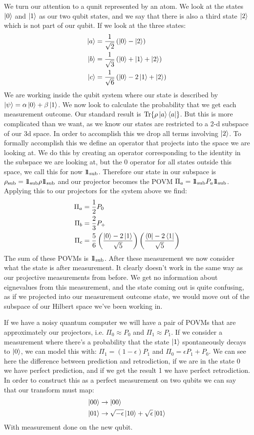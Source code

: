 We turn our attention to a qunit represented by an atom. We look at the states $\ket{0}$ and $\ket{1}$ as our two qubit states, and we say that there is also a third state $\ket{2}$ which is not part of our qubit. If we look at the three states:
\begin{align*}
	\ket{a} &= \frac{1}{\sqrt{2}} \left(\ket{0} - \ket{2}\right) \\
	\ket{b} &= \frac{1}{\sqrt{3}} \left(\ket{0} + \ket{1} + \ket{2}\right) \\
	\ket{c} &= \frac{1}{\sqrt{6}} \left( \ket{0} - 2\ket{1} + \ket{2}\right)
\end{align*}
We are working inside the qubit system where our state is described by $\ket{\psi} = \alpha\ket{0} + \beta \ket{1}$. We now look to calculate the probability that we get each measurement outcome.
Our standard result is $\Tr{\rho \ket{a}\bra{a}}$. But this is more complicated than we want, as we know our states are restricted to a 2-d subspace of our 3d space. 
In order to accomplish this we drop all terms involving $\ket{2}$. To formally accomplish this we define an operator that projects into the space we are looking at.
We do this by creating an operator corresponding to the identity in the subspace we are looking at, but the 0 operator for all states outside this space, we call this for now $1\!\!1_\text{sub}$.
Therefore our state in our subspace is $\rho_\text{sub} = 1\!\!1_\text{sub} \rho1\!\!1_\text{sub}$ and our projector becomes the POVM $\Pi_a = 1\!\!1_\text{sub}P_a1\!\!1_\text{sub}$.
Applying this to our projectors for the system above we find:
\begin{align*}
	\Pi_a &= \frac{1}{2} P_0 \\
	\Pi_b &= \frac{2}{3} P_+ \\
	\Pi_c &= \frac{5}{6} \left(\frac{\ket{0} - 2\ket{1}}{\sqrt{5}}\right)\left(\frac{\bra{0} - 2\bra{1}}{\sqrt{5}}\right)
\end{align*}
The sum of these POVMs is $1\!\!1_\text{sub}$. After these measurement we now consider what the state is after measurement. It clearly doesn't work in the same way as our projective measurements from before.
We get no information about eignevalues from this measurement, and the state coming out is quite confusing, as if we projected into our measurement outcome state, we would move out of the subspace of our Hilbert space we've been working in.

If we have a noisy quantum computer we will have a pair of POVMs that are approximately our projectors, i.e. $\Pi_0 \approx P_0$ and $\Pi_1 \approx P_1$. 
If we consider a measurement where there's a probability that the state $\ket{1}$ spontaneously decays to $\ket{0}$, we can model this with: $\Pi_1 = (1-\epsilon)P_1$ and $\Pi_0 = \epsilon P_1 + P_0$.
We can see here the difference between prediction and retrodiction, if we are in the state 0 we have perfect prediction, and if we get the result 1 we have perfect retrodiction.
In order to construct this as a perfect measurement on two qubits we can say that our transform must map:
\begin{align*}
	\ket{00} &\to \ket{00} \\
	\ket{01} &\to \sqrt{-\epsilon}\ket{10} + \sqrt{\epsilon}\ket{01}
\end{align*}
With measurement done on the new qubit.
